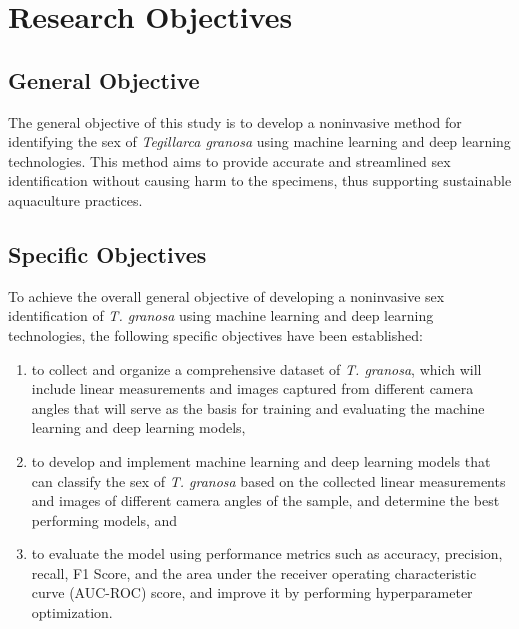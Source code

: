 \section{Research Objectives}
\label{sec:researchobjectives}

\subsection{General Objective}
\label{sec:generalobjective}

The general objective of this study is to develop a noninvasive method for identifying the sex of \textit{Tegillarca granosa} using machine learning and deep learning technologies. This method aims to provide accurate and streamlined sex identification without causing harm to the specimens, thus supporting sustainable aquaculture practices.

\subsection{Specific Objectives}
\label{sec:specificobjectives}

To achieve the overall general objective of developing a noninvasive sex identification of \textit{T. granosa} using machine learning and deep learning technologies, the following specific objectives have been established:  

\begin{enumerate}
	\item to collect and organize a comprehensive dataset of \textit{T. granosa}, which will include linear measurements and images captured from different camera angles that will serve as the basis for training and evaluating the machine learning and deep learning models,
	
	\item to develop and implement machine learning and deep learning models that can classify the sex of \textit{T. granosa} based on the collected linear measurements and images of different camera angles of the sample, and determine the best performing models, and
	
	\item to evaluate the model using performance metrics such as accuracy, precision, recall, F1 Score, and the area under the receiver operating characteristic curve (AUC-ROC) score, and improve it by performing hyperparameter optimization.
	
	
\end{enumerate}

